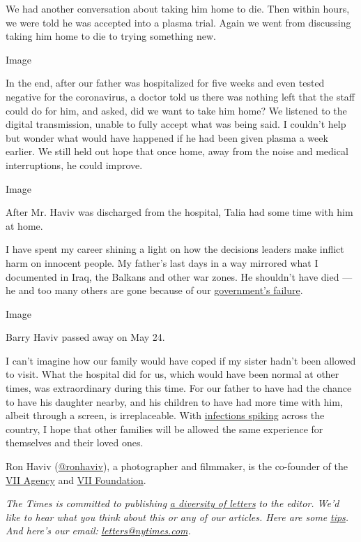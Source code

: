 We had another conversation about taking him home to die. Then within
hours, we were told he was accepted into a plasma trial. Again we went
from discussing taking him home to die to trying something new.

Image

In the end, after our father was hospitalized for five weeks and even
tested negative for the coronavirus, a doctor told us there was nothing
left that the staff could do for him, and asked, did we want to take him
home? We listened to the digital transmission, unable to fully accept
what was being said. I couldn't help but wonder what would have happened
if he had been given plasma a week earlier. We still held out hope that
once home, away from the noise and medical interruptions, he could
improve.

Image

After Mr. Haviv was discharged from the hospital, Talia had some time
with him at home.

I have spent my career shining a light on how the decisions leaders make
inflict harm on innocent people. My father's last days in a way mirrored
what I documented in Iraq, the Balkans and other war zones. He shouldn't
have died --- he and too many others are gone because of our
\href{https://www.nytimes.com/2020/04/11/us/politics/coronavirus-trump-response.html}{government's
failure}.

Image

Barry Haviv passed away on May 24.

I can't imagine how our family would have coped if my sister hadn't been
allowed to visit. What the hospital did for us, which would have been
normal at other times, was extraordinary during this time. For our
father to have had the chance to have his daughter nearby, and his
children to have had more time with him, albeit through a screen, is
irreplaceable. With
\href{https://www.nytimes.com/interactive/2020/us/coronavirus-us-cases.html?action=click\&module=Top\%20Stories\&pgtype=Homepage}{infections
spiking} across the country, I hope that other families will be allowed
the same experience for themselves and their loved ones.

Ron Haviv (\href{https://twitter.com/ronhaviv?lang=en}{@ronhaviv}), a
photographer and filmmaker, is the co-founder of the
\href{https://viiphoto.com/}{VII Agency} and
\href{https://theviifoundation.org/}{VII Foundation}.

\emph{The Times is committed to publishing}
\href{https://www.nytimes.com/2019/01/31/opinion/letters/letters-to-editor-new-york-times-women.html}{\emph{a
diversity of letters}} \emph{to the editor. We'd like to hear what you
think about this or any of our articles. Here are some}
\href{https://help.nytimes.com/hc/en-us/articles/115014925288-How-to-submit-a-letter-to-the-editor}{\emph{tips}}\emph{.
And here's our email:}
\href{mailto:letters@nytimes.com}{\emph{letters@nytimes.com}}\emph{.}

